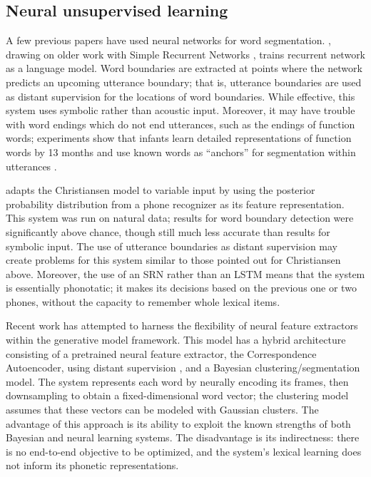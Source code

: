 \documentclass[11pt,letterpaper]{article}
\begin{document}
\subsection{Neural unsupervised learning}
\label{sub-neural}

A few previous papers have used neural networks for word
segmentation. , drawing on older work with
Simple Recurrent Networks \cite{Elman90}, trains recurrent network as
a language model. Word boundaries are extracted at points where the
network predicts an upcoming utterance boundary; that is, utterance
boundaries are used as distant supervision for the locations of word
boundaries. While effective, this system uses symbolic rather than
acoustic input. Moreover, it may have trouble with word endings which
do not end utterances, such as the endings of function words;
experiments show that infants learn detailed representations of
function words by 13 months \cite{Shi06} and use known words as
``anchors'' for segmentation within utterances \cite{Bortfeld05}.

 adapts the Christiansen model to variable input by
using the posterior probability distribution from a phone recognizer
as its feature representation. This system was run on natural data;
results for word boundary detection were significantly above chance,
though still much less accurate than results for symbolic input. The
use of utterance boundaries as distant supervision may create problems
for this system similar to those pointed out for Christiansen
above. Moreover, the use of an SRN rather than an LSTM means that the
system is essentially phonotatic; it makes its decisions based on the
previous one or two phones, without the capacity to remember whole
lexical items.

Recent work \cite{Kamper16} has attempted to harness the flexibility
of neural feature extractors within the generative model
framework. This model has a hybrid architecture consisting of a
pretrained neural feature extractor, the Correspondence Autoencoder,
using distant supervision \cite{Kamper15}, and a Bayesian
clustering/segmentation model. The system represents each word by
neurally encoding its frames, then downsampling to obtain a
fixed-dimensional word vector; the clustering model assumes that these
vectors can be modeled with Gaussian clusters. The advantage of this
approach is its ability to exploit the known strengths of both
Bayesian and neural learning systems. The disadvantage is its
indirectness: there is no end-to-end objective to be optimized, and
the system's lexical learning does not inform its phonetic
representations.
\end{document}
